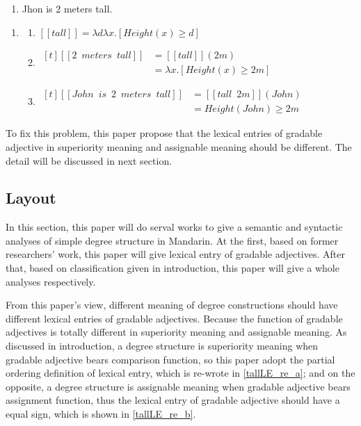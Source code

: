 \documentclass{ctexart}
\begin{document}
\begin{enumerate}
    \item \label{john_gao_2_mi} Jhon is 2 meters tall.
\end{enumerate}

\begin{enumerate}
    \item \label{john_gao_2_mi_LE}
    
    \begin{enumerate}
    \item \label{john_gao_2_mi_LE_a} 
    $[\![tall]\!] = \lambda d \lambda x.[Height(x) \geq d]$
    
    \item \label{john_gao_2_mi_LE_b} 
    $\begin{aligned}[t]
        [\![2 \enspace meters \enspace tall]\!] &= [\![tall]\!](2m) \\
        &= \lambda x.[Height(x) \geq 2m]
    \end{aligned}$
    
    \item \label{john_gao_2_mi_LE_c} 
    $\begin{aligned}[t]
        [\![John \enspace is \enspace 2 \enspace meters \enspace tall]\!] &= [\![tall \enspace 2m]\!](John) \\
        &= Height(John) \geq 2m
    \end{aligned}$
    
    \end{enumerate}
\end{enumerate}

To fix this problem, this paper propose that the lexical entries of gradable adjective in superiority meaning and assignable meaning should be different. The detail will be discussed in next section.

\subsection{Layout}

In this section, this paper will do serval works to give a semantic and syntactic analyses of simple degree structure in Mandarin. At the first, based on former researchers' work, this paper will give lexical entry of gradable adjectives. After that, based on classification given in introduction, this paper will give a whole analyses respectively.

From this paper's view, different meaning of degree constructions should have different lexical entries of gradable adjectives. Because the function of gradable adjectives is totally different in superiority meaning and assignable meaning. As discussed in introduction, a degree structure is superiority meaning when gradable adjective bears comparison function, so this paper adopt the partial ordering definition of lexical entry, which is re-wrote in \ref{tallLE_re_a}; and on the opposite, a degree structure is assignable meaning when gradable adjective bears assignment function, thus the lexical entry of gradable adjective should have a equal sign, which is shown in \ref{tallLE_re_b}.
\end{document}
